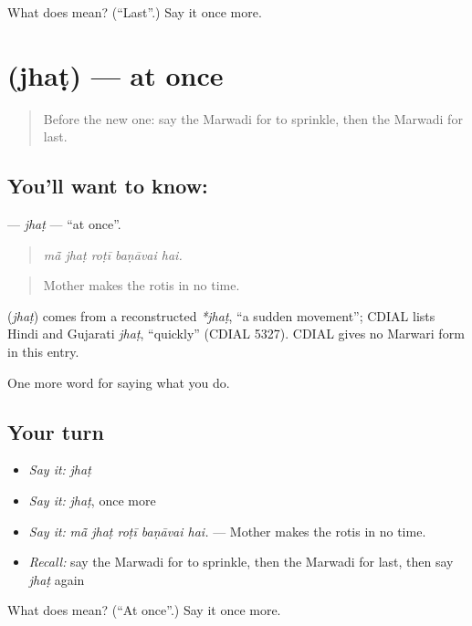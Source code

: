 \begin{tcolorbox}[breakable,colback=teal!4,colframe=teal!35!black,title={Before you move on}]
What does  mean? (\textquotedblleft{}Last\textquotedblright{}.) Say it once more.
\end{tcolorbox}
\section[\texorpdfstring{\mw{झट} (jhaṭ)}{झट (jhaṭ)}]{ (jhaṭ) — at once}

\label{lesson:MW-C167-jhat}



\begin{quote}
Before the new one: say the Marwadi for to sprinkle, then the Marwadi for last.
\end{quote}

\subsection*{You'll want to know: }
\textbf{} — \emph{jhaṭ} — \textquotedblleft{}at once\textquotedblright{}.

\begin{quote}
    
\end{quote}

\begin{quote}
\emph{mā̃ jhaṭ roṭī baṇāvai hai.}
\end{quote}

\begin{quote}
Mother makes the rotis in no time.
\end{quote}

\begin{cousinweb}
\textbf{} (\emph{jhaṭ}) comes from a reconstructed \emph{*jhaṭ}, \textquotedblleft{}a sudden movement\textquotedblright{}; CDIAL lists Hindi and Gujarati \emph{jhaṭ}, \textquotedblleft{}quickly\textquotedblright{} (CDIAL 5327). CDIAL gives no Marwari form in this entry.
\end{cousinweb}

\begin{grammarlens}[title={What you've built}]
One more word for saying what you do.
\end{grammarlens}

\subsection*{Your turn}
\begin{itemize}
\raggedright
  \item \emph{Say it:} \emph{jhaṭ}
  \item \emph{Say it:} \emph{jhaṭ}, once more
  \item \emph{Say it:} \emph{mā̃ jhaṭ roṭī baṇāvai hai.} — Mother makes the rotis in no time.
  \item \emph{Recall:} say the Marwadi for to sprinkle, then the Marwadi for last, then say \emph{jhaṭ} again
\end{itemize}

\begin{tcolorbox}[breakable,colback=teal!4,colframe=teal!35!black,title={Before you move on}]
What does  mean? (\textquotedblleft{}At once\textquotedblright{}.) Say it once more.
\end{tcolorbox}
